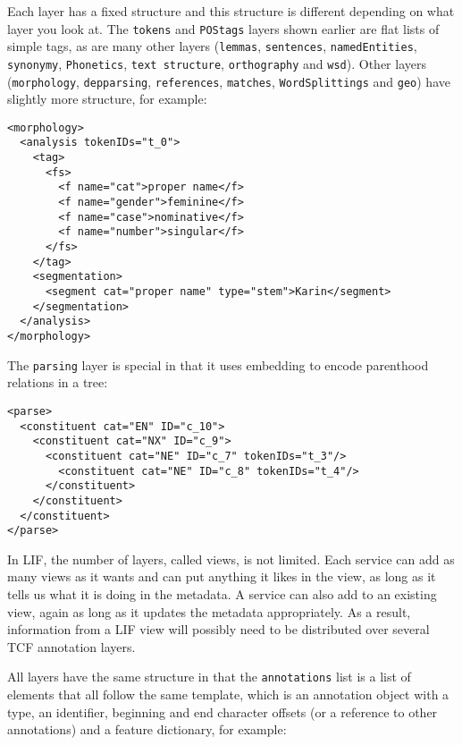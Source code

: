 \documentclass[11pt]{article}
\newcommand{\tag}[1]{{\tt #1}}
\newenvironment{example}
    {\begin{tcolorbox}\small}
    {\end{tcolorbox}}
\begin{document}
Each layer has a fixed structure and this structure is different depending on what layer you look at. The \tag{tokens} and \tag{POStags} layers shown earlier are flat lists of simple tags, as are many other layers (\tag{lemmas}, \tag{sentences}, \tag{namedEntities}, \tag{synonymy}, \tag{Phonetics}, \tag{text structure}, \tag{orthography} and \tag{wsd}). Other layers (\tag{morphology}, \tag{depparsing}, \tag{references}, \tag{matches}, \tag{WordSplittings} and \tag{geo}) have slightly more structure, for example:

\begin{example}
\begin{verbatim}
<morphology>
  <analysis tokenIDs="t_0">
    <tag>
      <fs>
        <f name="cat">proper name</f>
        <f name="gender">feminine</f>
        <f name="case">nominative</f>
        <f name="number">singular</f>
      </fs>
    </tag>
    <segmentation>
      <segment cat="proper name" type="stem">Karin</segment>
    </segmentation>
  </analysis>
</morphology>
\end{verbatim}
\end{example}

The \tag{parsing} layer is special in that it uses embedding to encode parenthood relations in a tree:

\begin{example}
\begin{verbatim}
<parse>
  <constituent cat="EN" ID="c_10">
    <constituent cat="NX" ID="c_9">
      <constituent cat="NE" ID="c_7" tokenIDs="t_3"/>
        <constituent cat="NE" ID="c_8" tokenIDs="t_4"/>
      </constituent>
    </constituent>
  </constituent>
</parse>
\end{verbatim}
\end{example}

In LIF, the number of layers, called views, is not limited. Each service can add as many views as it wants and can put anything it likes in the view, as long as it tells us what it is doing in the metadata. A service can also add to an existing view, again as long as it updates the metadata appropriately. As a result, information from a LIF view will possibly need to be distributed over several TCF annotation layers.

All layers have the same structure in that the \tag{annotations} list is a list of elements that all follow the same template, which is an annotation object with a type, an identifier, beginning and end character offsets (or a reference to other annotations) and a feature dictionary, for example:
\end{document}
